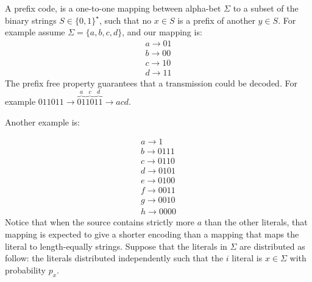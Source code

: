
  \item {}  A prefix code, is a one-to-one mapping between alpha-bet $\Sigma$ to a subset of the binary strings $S \in \{0,1\}^{\star}$, such that no $x \in S$ is a prefix of another $y \in S$. For example assume $\Sigma = \{a,b,c, d\}$, and our mapping is: 
    \begin{equation*}
      \begin{split}
        a  \rightarrow 01 \\
        b \rightarrow 00 \\
        c \rightarrow 10 \\
        d \rightarrow 11 
      \end{split}
    \end{equation*} 
    The prefix free property guarantees that a transmission could be decoded. For example $011011 \rightarrow\overbrace{01}^{a}\overbrace{10}^{c} \overbrace{11}^{d} \rightarrow  acd$. 

Another example is: 

    \begin{equation*}
      \begin{split}
        a \rightarrow 1 \\
        b \rightarrow 0111 \\
        c \rightarrow 0110 \\
        d \rightarrow 0101 \\
        e \rightarrow 0100 \\
        f \rightarrow 0011 \\
        g \rightarrow 0010 \\
        h \rightarrow 0000 
      \end{split}
    \end{equation*}
    Notice that when the source contains strictly more $a$ than the other literals, that mapping is expected to give a shorter encoding than a mapping that maps the literal to length-equally strings. Suppose that the literals in $\Sigma$ are distributed as follow: the literals distributed independently such that the $i$ literal is $x \in \Sigma$ with probability $p_{x}$. 


